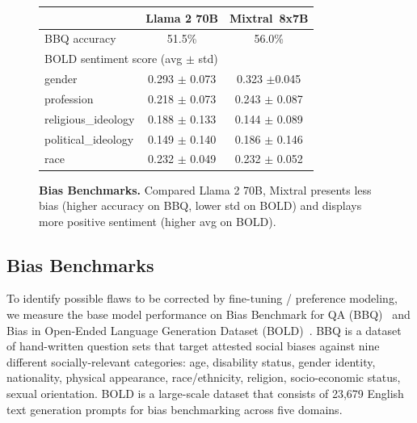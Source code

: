 \documentclass{article}
\def\llama{Llama\xspace}
\def\mixtral{Mixtral\xspace}
\def\mixtralEXSB{Mixtral~8x7B\xspace}
\begin{document}
\pagebreak
\setlength{\tabcolsep}{10pt}
\begin{figure}
\vspace{-10pt}
\small
\centering
    \begin{tabular}{@{}lcc@{}}
    \toprule
& \textbf{\llama 2 70B} & \textbf{\mixtralEXSB} \\ \midrule
    BBQ accuracy & 51.5\%              & 56.0\%  \\ %
    \midrule
\multicolumn{3}{l}{\hspace{-0.35cm}BOLD sentiment score (avg $\pm$ std) 
}
\\[3pt]  
    \footnotesize{gender}              & \footnotesize{0.293 $\pm$ 0.073}       & \footnotesize{0.323 $\pm$0.045}        \\[1pt]
    \footnotesize{profession}          & \footnotesize{0.218 $\pm$ 0.073}       & \footnotesize{0.243 $\pm$ 0.087}         \\[1pt]
    \footnotesize{religious\_ideology} & \footnotesize{0.188 $\pm$ 0.133}       & \footnotesize{0.144 $\pm$ 0.089}         \\[1pt]
    \footnotesize{political\_ideology} & \footnotesize{0.149 $\pm$ 0.140}       & \footnotesize{0.186 $\pm$ 0.146}         \\[1pt]
    \footnotesize{race}                & \footnotesize{0.232 $\pm$ 0.049}       & \footnotesize{0.232 $\pm$ 0.052}         \\ \bottomrule
    \end{tabular}
    \vspace{2pt}
    \caption{\small \textbf{Bias Benchmarks.} Compared \llama 2 70B, \mixtral presents less bias (higher accuracy on BBQ, lower std on BOLD) and displays more positive sentiment (higher avg on BOLD).}
    \label{tab:bias}
    \vspace{-10pt}
\end{figure}
\subsection{Bias Benchmarks} 

To identify possible flaws to be corrected by fine-tuning / preference modeling, we measure the base model performance on Bias Benchmark for QA (BBQ)~\cite{parrish2021bbq} and Bias in Open-Ended Language Generation Dataset (BOLD)~\cite{dhamala2021bold}.
BBQ is a dataset of hand-written question sets that target attested social biases against nine different socially-relevant categories: age, disability status, gender identity, nationality, physical appearance, race/ethnicity, religion, socio-economic status, sexual orientation. BOLD is a large-scale dataset that consists of 23,679 English text generation prompts for bias benchmarking across five domains.
\end{document}
